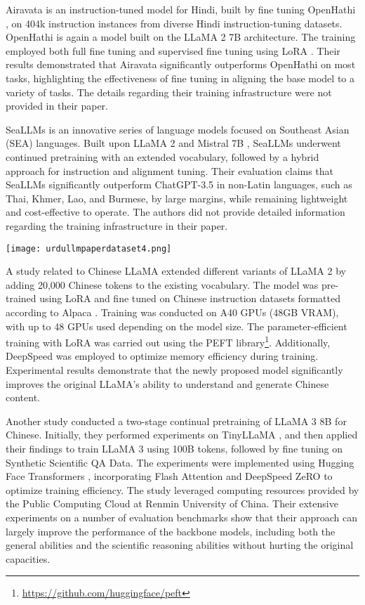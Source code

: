 Airavata \citep{21} is an instruction-tuned model for Hindi, built by fine tuning OpenHathi \citep{22}, on 404k instruction instances from diverse Hindi instruction-tuning datasets. OpenHathi \citep{22} is again a model built on the LLaMA 2 7B architecture. The training employed both full fine tuning and supervised fine tuning using LoRA \citep{lora}. Their results demonstrated that Airavata significantly outperforms OpenHathi on most tasks, highlighting the effectiveness of fine tuning in aligning the base model to a variety of tasks. The details regarding their training infrastructure were not provided in their paper.

SeaLLMs \citep{seallm} is an innovative series of language models focused on Southeast Asian (SEA) languages. Built upon LLaMA 2 \citep{llama2} and Mistral 7B \citep{mistral7b}, SeaLLMs underwent continued pretraining with an extended vocabulary, followed by a hybrid approach for instruction and alignment tuning. Their evaluation claims that SeaLLMs significantly outperform ChatGPT-3.5 in non-Latin languages, such as Thai, Khmer, Lao, and Burmese, by large margins, while remaining lightweight and cost-effective to operate. The authors did not provide detailed information regarding the training infrastructure in their paper.

\begin{figure*}[!t]
    \centering
    \texttt{[image: urdullmpaperdataset4.png]} 
    \caption{Development of UrduLLaMA 1.0}
    \label{fig:example-image}
\end{figure*} 


A study related to Chinese LLaMA \citep{24} extended different variants of LLaMA 2 \citep{llama2} by adding 20,000 Chinese tokens to the existing vocabulary. The model was pre-trained using LoRA \citep{lora} and fine tuned on Chinese instruction datasets formatted according to Alpaca \citep{alpaca}. Training was conducted on A40 GPUs (48GB VRAM), with up to 48 GPUs used depending on the model size. The parameter-efficient training with LoRA was carried out using the PEFT library\footnote{\url{https://github.com/huggingface/peft}}. Additionally, DeepSpeed \citep{deepspeed} was employed to optimize memory efficiency during training. Experimental results demonstrate that the newly proposed model significantly improves the original LLaMA's ability to understand and generate Chinese content.

Another study \citep{25} conducted a two-stage continual pretraining of LLaMA 3 8B \citep{llama3} for Chinese. Initially, they performed experiments on TinyLLaMA \citep{tinyllama}, and then applied their findings to train LLaMA 3 using 100B tokens, followed by fine tuning on Synthetic Scientific QA Data. The experiments were implemented using Hugging Face Transformers \citep{26}, incorporating Flash Attention and DeepSpeed ZeRO \citep{deepspeed} to optimize training efficiency. The study leveraged computing resources provided by the Public Computing Cloud at Renmin University of China. Their extensive experiments on a number
of evaluation benchmarks show that their approach can largely improve the performance of the backbone models, including both the general abilities and the scientific reasoning abilities without hurting the original capacities.


